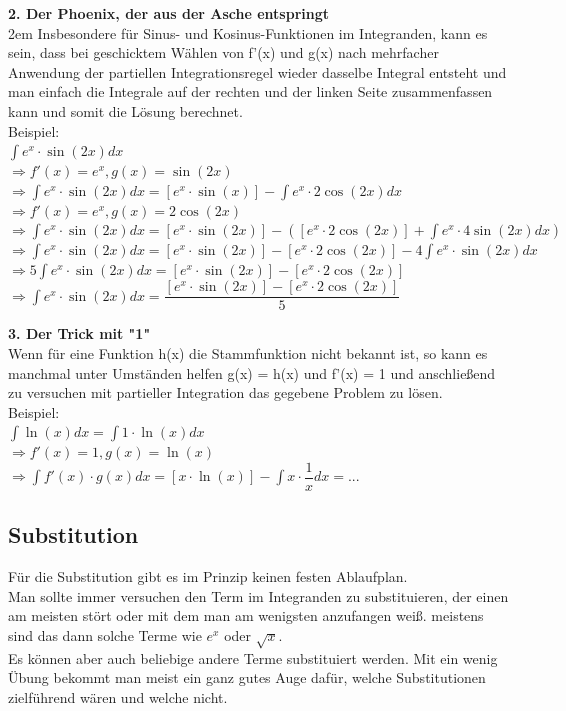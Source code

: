 \documentclass[11pt,final]{scrreprt}
\newcommand{\br} {\medskip\\}
\begin{document}
\textbf{2. Der Phoenix, der aus der Asche entspringt}\br

\begingroup
\leftskip2em 
Insbesondere für Sinus- und Kosinus-Funktionen im Integranden, kann es sein, dass bei geschicktem Wählen von f'(x) und g(x) nach mehrfacher Anwendung der partiellen Integrationsregel wieder dasselbe Integral entsteht und man einfach die Integrale auf der rechten und der linken Seite zusammenfassen kann und somit die Lösung berechnet. \br
Beispiel:\\
$ \int e^x\cdot \sin(2x) dx $\br
\hspace*{2em}$\Rightarrow f'(x) = e^x, g(x) = \sin(2x)$\br
$\Rightarrow \int e^x\cdot \sin(2x) dx = [e^x\cdot \sin(x)]-\int e^x\cdot 2\cos(2x) dx$\br
\hspace*{2em}$\Rightarrow f'(x) = e^x, g(x) = 2\cos(2x)$\br
$\Rightarrow \int e^x\cdot \sin(2x) dx = [e^x\cdot \sin(2x)]-\left([e^x\cdot 2\cos(2x)]+\int e^x\cdot 4\sin(2x) dx\right)$\br
$\Rightarrow \int e^x\cdot \sin(2x) dx =[e^x\cdot \sin(2x)]-[e^x\cdot 2\cos(2x)]-4\int e^x\cdot \sin(2x) dx$ \br
$\Rightarrow 5\int e^x\cdot \sin(2x) dx =[e^x\cdot \sin(2x)]-[e^x\cdot 2\cos(2x)]$\br
$\Rightarrow \int e^x\cdot \sin(2x) dx =\dfrac{[e^x\cdot \sin(2x)]-[e^x\cdot 2\cos(2x)]}{5}$\\
\par	
\endgroup 

\textbf{3. Der Trick mit "1"}\br
Wenn für eine Funktion h(x) die Stammfunktion nicht bekannt ist, so kann es manchmal unter Umständen helfen g(x) = h(x) und f'(x) = 1 und anschließend zu versuchen mit partieller Integration das gegebene Problem zu lösen.\br
Beispiel:\br
$ \int\ln(x) dx = \int 1\cdot\ln(x) dx$\\
$\Rightarrow f'(x) = 1, g(x) = \ln(x)$\\
$\Rightarrow \int f'(x)\cdot g(x) dx = [x\cdot \ln(x)]-\int x\cdot \dfrac{1}{x} dx = ...$\\

\subsection{Substitution}
Für die Substitution gibt es im Prinzip keinen festen Ablaufplan.\\
Man sollte immer versuchen den Term im Integranden zu substituieren, der einen am meisten stört oder mit dem man am wenigsten anzufangen weiß. meistens sind das dann solche Terme wie $e^x$ oder $\sqrt{x}$.\\
Es können aber auch beliebige andere Terme substituiert werden. Mit ein wenig Übung bekommt man meist ein ganz gutes Auge dafür, welche Substitutionen zielführend wären und welche nicht.
\end{document}
